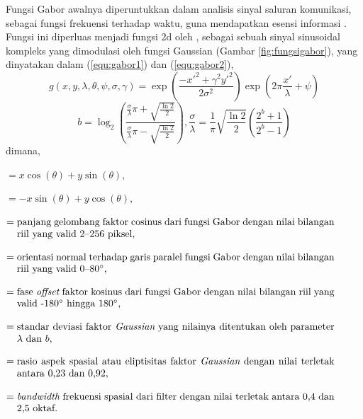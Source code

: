 Fungsi Gabor awalnya diperuntukkan dalam analisis sinyal saluran komunikasi, sebagai fungsi frekuensi terhadap waktu, guna mendapatkan esensi informasi . Fungsi ini diperluas menjadi fungsi \acrshort{2d} oleh , sebagai sebuah sinyal sinusoidal kompleks yang dimodulasi oleh fungsi Gaussian (Gambar \ref{fig:fungsigabor}), yang dinyatakan  dalam (\ref{equ:gabor1}) dan (\ref{equ:gabor2}),
\begin{equation}
    g(x,y,\lambda,\theta,\psi,\sigma,\gamma) = \exp\left(\frac{-x'^2+\gamma^2y'^2}{2\sigma^2}\right) \exp\left(2\pi\frac{x'}{\lambda}+\psi\right)
    \label{equ:gabor1}
\end{equation}
\begin{equation}
    b = \log_2{\left(\frac{\frac{\sigma}{\lambda}\pi+\sqrt{\frac{\ln{2}}{2}}}{\frac{\sigma}{\lambda}\pi-\sqrt{\frac{\ln{2}}{2}}}\right)}, \frac{\sigma}{\lambda} = \frac{1}{\pi}\sqrt{\frac{\ln{2}}{2}}\left(\frac{2^b+1}{2^b-1}\right)
    \label{equ:gabor2}
\end{equation}
dimana,
\begin{description}[align=parleft,labelwidth=1cm]
    \item[$x'$] $= x\cos(\theta) + y\sin(\theta),$
    \item[$y'$] $= -x\sin(\theta) + y\cos(\theta),$
    \item[$\lambda$] $= \parbox[t]{11.3cm}{panjang gelombang faktor cosinus dari fungsi Gabor dengan nilai bilangan riil yang valid 2--256 piksel,}$
    \item[$\theta$] $= \parbox[t]{11.3cm}{orientasi normal terhadap garis paralel fungsi Gabor dengan nilai bilangan riil yang valid 0--80\degree,}$
    \item[$\psi$] $= \parbox[t]{11.3cm}{fase {\itshape offset} faktor kosinus dari fungsi Gabor dengan nilai bilangan riil yang valid -180\degree\ hingga 180\degree,}$
    \item[$\sigma$] $= \parbox[t]{11.3cm}{standar deviasi faktor {\itshape Gaussian} yang nilainya ditentukan oleh parameter $\lambda$ dan $b$,}$
    \item[$\gamma$] $= \parbox[t]{11.3cm}{rasio aspek spasial atau eliptisitas faktor {\itshape Gaussian} dengan nilai terletak antara 0,23 dan 0,92,}$
    \item[$b$] $= \parbox[t]{11.3cm}{{\itshape bandwidth} frekuensi spasial dari filter dengan nilai terletak antara 0,4 dan 2,5 oktaf.}$
\end{description}

